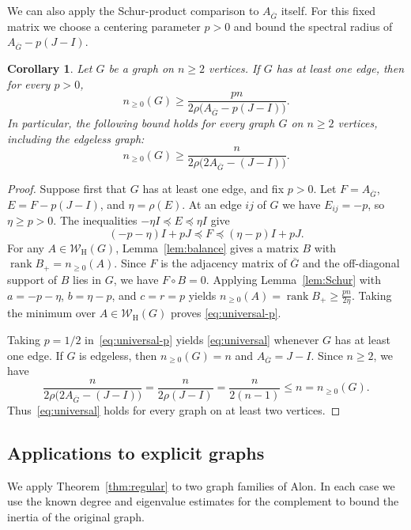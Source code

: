 \documentclass[11pt]{article}
\numberwithin{equation}{section}
\newtheorem{corollary}[theorem]{Corollary}
\theoremstyle{definition}
\theoremstyle{remark}
\DeclareMathOperator{\rank}{rank}
\newcommand{\W}{\mathcal W_{\mathrm H}}
\begin{document}
We can also apply the Schur-product comparison to $A_{\overline G}$
itself. For this fixed matrix we choose a centering parameter $p>0$
and bound the spectral radius of $A_{\overline G}-p(J-I)$.

\begin{corollary}
\label{thm:universal}
Let $G$ be a graph on $n\geq2$ vertices.
If $G$ has at least one edge, then for every $p>0$,
\begin{equation}\label{eq:universal-p}
 n_{\geq0}(G)\geq
 \frac{pn}{2\rho\bigl(A_{\overline G}-p(J-I)\bigr)}.
\end{equation}
In particular, the following bound holds for every graph $G$
on $n\geq2$ vertices, including the edgeless graph:
\begin{equation}\label{eq:universal}
 n_{\geq0}(G)\geq
 \frac{n}{2\rho\bigl(2A_{\overline G}-(J-I)\bigr)}.
\end{equation}
\end{corollary}

\begin{proof}
Suppose first that $G$ has at least one edge, and fix $p>0$.
Let $F=A_{\overline G}$, $E=F-p(J-I)$, and $\eta=\rho(E)$.
At an edge $ij$ of $G$ we have $E_{ij}=-p$, so $\eta\geq p>0$.
The inequalities $-\eta I\preceq E\preceq\eta I$ give
\[
 (-p-\eta)I+pJ
 \preceq F\preceq
 (\eta-p)I+pJ.
\]
For any $A\in\W(G)$, Lemma~\ref{lem:balance} gives a matrix
$B$ with $\rank B_+=n_{\geq0}(A)$. Since $F$ is the adjacency
matrix of $\overline G$ and the off-diagonal support of $B$
lies in $G$, we have $F\circ B=0$. Applying Lemma~\ref{lem:Schur}
with $a=-p-\eta$, $b=\eta-p$, and $c=r=p$ yields
$n_{\geq0}(A)=\rank B_+ \geq\frac{pn}{2\eta}$.
Taking the minimum over $A\in\W(G)$ proves
\eqref{eq:universal-p}.

Taking $p=1/2$ in~\eqref{eq:universal-p} yields
\eqref{eq:universal} whenever $G$ has at least one edge.
If $G$ is edgeless, then $n_{\geq0}(G)=n$ and
$A_{\overline G}=J-I$. Since $n\geq2$, we have
\[
 \frac{n}{2\rho\bigl(2A_{\overline G}-(J-I)\bigr)}
 =\frac{n}{2\rho(J-I)}
 =\frac{n}{2(n-1)}
 \leq n
 =n_{\geq0}(G).
\]
Thus~\eqref{eq:universal} holds for every graph on at least
two vertices.
\end{proof}

\subsection{Applications to explicit graphs}\label{sec:applications}

We apply Theorem~\ref{thm:regular} to two graph families of Alon.
In each case we use the known degree and eigenvalue estimates for the
complement to bound the inertia of the original graph.
\end{document}
